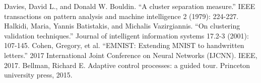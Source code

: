 \documentclass[conference]{IEEEtran}
\begin{document}
\begin{thebibliography}{00}
 Davies, David L., and Donald W. Bouldin. ``A cluster separation measure.'' IEEE transactions on pattern analysis and machine intelligence 2 (1979): 224-227.
 Halkidi, Maria, Yannis Batistakis, and Michalis Vazirgiannis. ``On clustering validation techniques.'' Journal of intelligent information systems 17.2-3 (2001): 107-145.
 Cohen, Gregory, et al. ``EMNIST: Extending MNIST to handwritten letters.'' 2017 International Joint Conference on Neural Networks (IJCNN). IEEE, 2017.
 Bellman, Richard E. Adaptive control processes: a guided tour. Princeton university press, 2015.

\end{thebibliography}
\end{document}
